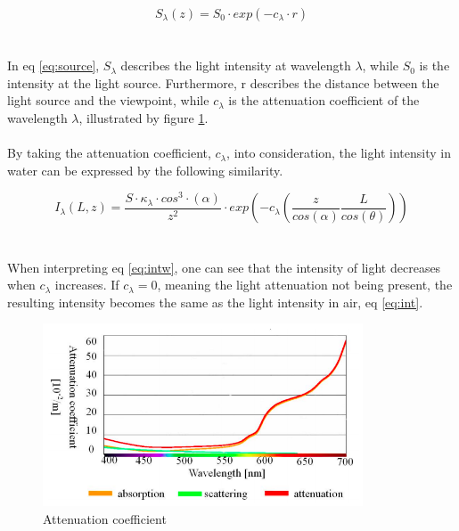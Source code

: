 \begin{equation} \label{eq:source}
S_{\lambda} (z) = S_0 \cdot exp (-c_{\lambda} \cdot r)
\end{equation}
\\\\
In eq \ref{eq:source}, $S_{\lambda}$ describes the light intensity at wavelength $\lambda$, while $S_0$ is the intensity at the light source. Furthermore, r describes the distance between the light source and the viewpoint, while $c_{\lambda}$ is the attenuation coefficient of the wavelength $\lambda$, illustrated by figure \ref{fig:attcoeff}.
\\\\
By taking the attenuation coefficient, $c_{\lambda}$, into consideration, the light intensity in water can be expressed by the following similarity. 

\begin{equation} \label{eq:intw}
    I_ {\lambda} (L, z) = \frac{S \cdot \kappa_{\lambda}\cdot cos^{3}\cdot (\alpha)}{z^2} \cdot exp \left(-c_{\lambda}\left(\frac{z}{cos(\alpha)}\frac{L}{cos(\theta)}\right)\right)
\end{equation}
\\\\
When interpreting eq \ref{eq:intw}, one can see that the intensity of light decreases when $c_{\lambda}$ increases. If $c_{\lambda} = 0$, meaning the light attenuation not being present, the resulting intensity becomes the same as the light intensity in air, eq \ref{eq:int}. 

\begin{figure}[H]
\centering
  \includegraphics[width=9.5cm]{Images/theory/attcoeff.png}
  \caption{Attenuation coefficient}
  \label{fig:attcoeff}
\end{figure}




